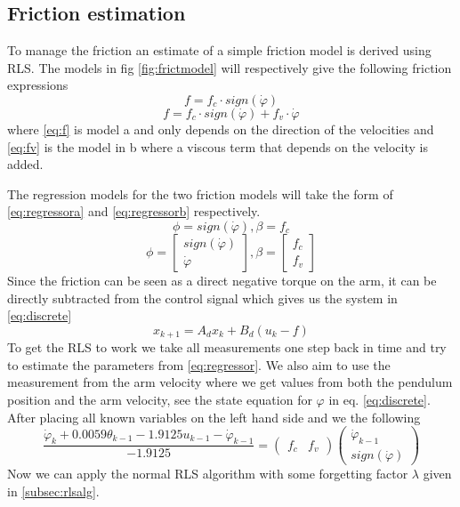 \documentclass[10pt,a4paper]{article}
\begin{document}
\subsection{Friction estimation}
\label{sec:fricEst}
To manage the friction an estimate of a simple friction model is derived using RLS. The models in fig \ref{fig:frictmodel} will respectively give the following friction expressions 
\begin{equation}
 f=f_c\cdot sign(\dot{\varphi})
 \label{eq:f}
 \end{equation}
\begin{equation}
 f=f_c\cdot sign(\dot{\varphi})+f_v\cdot \dot{\varphi}
 \label{eq:fv}
 \end{equation}
where \ref{eq:f} is model a and only depends on the direction of the velocities and \ref{eq:fv} is the model in b where a viscous term that depends on the velocity is added.
 
The regression models for the two friction models will take the form of \ref{eq:regressora} and \ref{eq:regressorb} respectively.
\begin{equation}
\phi=sign(\dot{\varphi}), \beta = f_c
\label{eq:regressora}
\end{equation}
\begin{equation}
\phi=\begin{bmatrix}
sign(\dot{\varphi}) \\
\dot{\varphi}
\end{bmatrix}, \beta = \begin{bmatrix}
f_c\\
f_v
\end{bmatrix}
\label{eq:regressorb}
\end{equation}
Since the friction can be seen as a direct negative torque on the arm, it can be directly subtracted from the control signal which gives us the system in \ref{eq:discrete}
$$x_{k+1} = A_dx_k + B_d(u_k - f)$$
To get the RLS to work we take all measurements one step back in time and try to estimate the parameters from \ref{eq:regressor}. We also aim to use the measurement from the arm velocity where we get values from both the pendulum position and the arm velocity, see the state equation for $ \varphi $  in eq. \ref{eq:discrete}. After placing all known variables on the left hand side and we the following
\begin{equation}
\frac{\dot{\varphi}_k + 0.0059\theta_{k-1}-1.9125u_{k-1}-\dot{\varphi}_{k-1}}{-1.9125} = \begin{pmatrix}
f_c & f_v
\end{pmatrix}\begin{pmatrix}
\dot{\varphi}_{k-1}\\
sign(\dot{\varphi})
\end{pmatrix}
\label{eq:estim}
\end{equation}
Now we can apply the normal RLS algorithm with some forgetting factor $\lambda$ given in \ref{subsec:rlsalg}.
\end{document}
